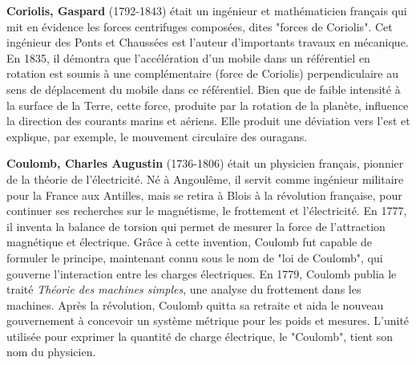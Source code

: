 \textbf{Coriolis, Gaspard} (1792-1843) était un ingénieur et mathématicien français qui mit en évidence les forces centrifuges composées, dites "forces de Coriolis". Cet ingénieur des Ponts et Chaussées est l'auteur d'importants travaux en mécanique. En 1835, il démontra que l'accélération d'un mobile dans un référentiel en rotation est soumis à une complémentaire (force de Coriolis) perpendiculaire au sens de déplacement du mobile dans ce référentiel. Bien que de faible intensité à la surface de la Terre, cette force, produite par la rotation de la planète, influence la direction des courants marins et aériens. Elle produit une déviation vers l'est et explique, par exemple, le mouvement circulaire des ouragans.

\textbf{Coulomb, Charles Augustin} (1736-1806) était un physicien français, pionnier de la théorie de l'électricité. Né à Angoulême, il servit comme ingénieur militaire pour la France aux Antilles, mais se retira à Blois à la révolution française, pour continuer ses recherches sur le magnétisme, le frottement et l'électricité. En 1777, il inventa la balance de torsion qui permet de mesurer la force de l'attraction magnétique et électrique. Grâce à cette invention, Coulomb fut capable de formuler le principe, maintenant connu sous le nom de "loi de Coulomb", qui gouverne l'interaction entre les charges électriques. En 1779, Coulomb publia le traité \textit{Théorie des machines simples}, une analyse du frottement dans les machines. Après la révolution, Coulomb quitta sa retraite et aida le nouveau gouvernement à concevoir un système métrique pour les poids et mesures. L'unité utilisée pour exprimer la quantité de charge électrique, le "Coulomb", tient son nom du physicien.

